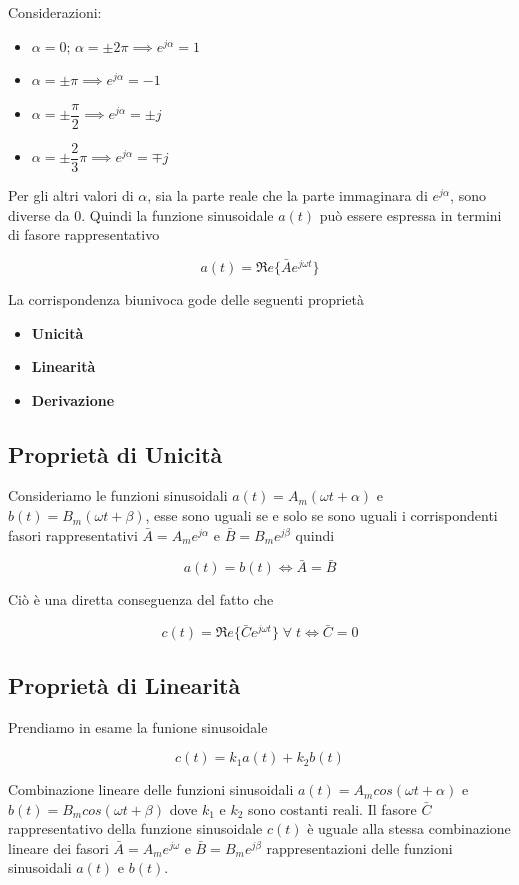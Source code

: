 \documentclass[a4paper]{report}
\begin{document}
Considerazioni:
\begin{itemize}
\item $\alpha = 0$; $\alpha=\pm 2\pi \implies e^{j\alpha} = 1$
\item $\alpha = \pm \pi \implies e^{j\alpha} = -1$
\item $\alpha = \pm \dfrac{\pi}{2} \implies e^{j\alpha} = \pm j$
\item $\alpha = \pm \dfrac{2}{3}\pi \implies e^{j\alpha} = \mp j$
\end{itemize}
Per gli altri valori di $\alpha$, sia la parte reale che la parte
immaginara di $e^{j\alpha}$, sono diverse da $0$.
Quindi la funzione sinusoidale $a(t)$ pu\`o essere espressa in termini
di fasore rappresentativo

\[
a(t)=\Re e\{\bar{A}e^{j\omega t}\}
\]

La corrispondenza biunivoca gode delle seguenti propriet\`a
\begin{itemize}
\item {\bf Unicit\`a}
\item {\bf Linearit\`a}
\item {\bf Derivazione}
\end{itemize}

\subsection{Propriet\`a di Unicit\`a}
Consideriamo le funzioni sinusoidali $a(t) = A_m(\omega t+\alpha)$ e
$b(t) = B_m(\omega t+\beta)$, esse sono uguali se e solo se sono
uguali i corrispondenti fasori rappresentativi $\bar{A} =
A_me^{j\alpha}$ e $\bar{B} = B_me^{j\beta}$ quindi

\[
a(t)=b(t) \Longleftrightarrow \bar{A}=\bar{B}
\]

Ci\`o \`e una diretta conseguenza del fatto che

\[
c(t)=\Re e \{ \bar{C}e^{j\omega t} \}\; \forall\; t \Longleftrightarrow
\bar{C}=0
\]

\subsection{Propriet\`a di Linearit\`a}
Prendiamo in esame la funione sinusoidale

\[
c(t) = k_1a(t)+k_2b(t)
\]

Combinazione lineare delle funzioni sinusoidali $a(t) = A_mcos(\omega
t + \alpha)$ e \\$b(t) = B_mcos(\omega t + \beta)$ dove $k_1$ e $k_2$
sono costanti reali.
Il fasore $\bar{C}$ rappresentativo della funzione sinusoidale $c(t)$
\`e uguale alla stessa combinazione lineare dei fasori $\bar{A} =
A_me^{j\omega}$ e $\bar{B} = B_me^{j\beta}$ rappresentazioni delle
funzioni sinusoidali $a(t)$ e $b(t)$.
\end{document}
